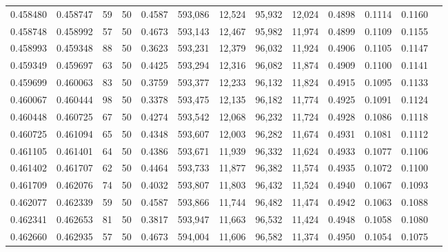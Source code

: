 \begin{tabular}{rrrrrrrrrrrrr}
0.458480 & 0.458747 &    59 &  50 &                                     0.4587 & 593,086 &  12,524 &  95,932 &  12,024 & 0.4898 & 0.1114 & 0.1160 \\
0.458748 & 0.458992 &    57 &  50 &                                     0.4673 & 593,143 &  12,467 &  95,982 &  11,974 & 0.4899 & 0.1109 & 0.1155 \\
0.458993 & 0.459348 &    88 &  50 &                                     0.3623 & 593,231 &  12,379 &  96,032 &  11,924 & 0.4906 & 0.1105 & 0.1147 \\
0.459349 & 0.459697 &    63 &  50 &                                     0.4425 & 593,294 &  12,316 &  96,082 &  11,874 & 0.4909 & 0.1100 & 0.1141 \\
0.459699 & 0.460063 &    83 &  50 &                                     0.3759 & 593,377 &  12,233 &  96,132 &  11,824 & 0.4915 & 0.1095 & 0.1133 \\
0.460067 & 0.460444 &    98 &  50 &                                     0.3378 & 593,475 &  12,135 &  96,182 &  11,774 & 0.4925 & 0.1091 & 0.1124 \\
0.460448 & 0.460725 &    67 &  50 &                                     0.4274 & 593,542 &  12,068 &  96,232 &  11,724 & 0.4928 & 0.1086 & 0.1118 \\
0.460725 & 0.461094 &    65 &  50 &                                     0.4348 & 593,607 &  12,003 &  96,282 &  11,674 & 0.4931 & 0.1081 & 0.1112 \\
0.461105 & 0.461401 &    64 &  50 &                                     0.4386 & 593,671 &  11,939 &  96,332 &  11,624 & 0.4933 & 0.1077 & 0.1106 \\
0.461402 & 0.461707 &    62 &  50 &                                     0.4464 & 593,733 &  11,877 &  96,382 &  11,574 & 0.4935 & 0.1072 & 0.1100 \\
0.461709 & 0.462076 &    74 &  50 &                                     0.4032 & 593,807 &  11,803 &  96,432 &  11,524 & 0.4940 & 0.1067 & 0.1093 \\
0.462077 & 0.462339 &    59 &  50 &                                     0.4587 & 593,866 &  11,744 &  96,482 &  11,474 & 0.4942 & 0.1063 & 0.1088 \\
0.462341 & 0.462653 &    81 &  50 &                                     0.3817 & 593,947 &  11,663 &  96,532 &  11,424 & 0.4948 & 0.1058 & 0.1080 \\
0.462660 & 0.462935 &    57 &  50 &                                     0.4673 & 594,004 &  11,606 &  96,582 &  11,374 & 0.4950 & 0.1054 & 0.1075 \\

\end{tabular}
